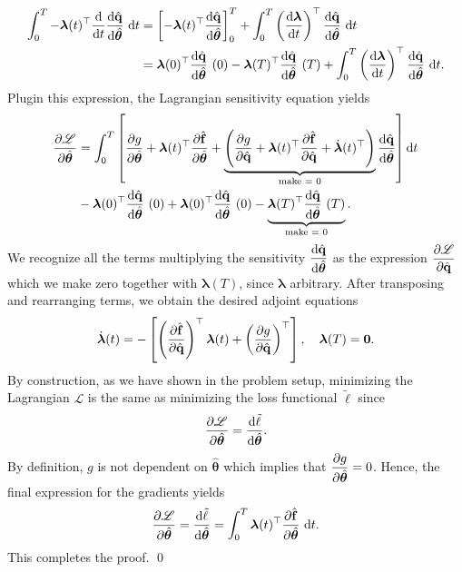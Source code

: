 \begin{align*}
    \int_0^T -\bm{\lambda}(t)^{\top}\dv{t}\dv{\hat{\mathbf{q}}}{\hat{\bm{\theta}}}~\dd t &= \left[ -\bm{\lambda}(t)^{\top}\dv{\hat{\mathbf{q}}}{\hat{\bm{\theta}}}\right]_0^T + \int_0^T \left( \dv{\bm{\lambda}}{t}\right)^{\top}\dv{\hat{\mathbf{q}}}{\hat{\bm{\theta}}}~\dd t\\
    &= \bm{\lambda}(0)^{\top}\dv{\hat{\mathbf{q}}}{\hat{\bm{\theta}}}~(0) - \bm{\lambda}(T)^{\top}\dv{\hat{\mathbf{q}}}{\hat{\bm{\theta}}}~(T) + \int_0^T \left( \dv{\bm{\lambda}}{t}\right)^{\top}\dv{\hat{\mathbf{q}}}{\hat{\bm{\theta}}}~\dd t.
\end{align*}
Plugin this expression, the Lagrangian sensitivity equation  yields\\
\begin{align*}
   \pdv{\mathscr{L}}{\hat{\bm{\theta}}} &= \int_0^T\left[ \pdv{g}{\hat{\bm{\theta}}} + \bm{\lambda}(t)^{\top} \pdv{\hat{\mathbf{f}}}{\hat{\bm{\theta}}} + \underbrace{\left( \pdv{g}{\hat{\mathbf{q}}} + \bm{\lambda}(t)^{\top}\pdv{\hat{\mathbf{f}}}{\hat{\mathbf{q}}}+ \dot{\bm{\lambda}}(t)^{\top}\right)}_{\text{make = 0}} \dv{\hat{\mathbf{q}}}{\hat{\bm{\theta}}} \right]\dd t \\
   & - \bm{\lambda}(0)^{\top}\dv{\hat{\mathbf{q}}}{\hat{\bm{\theta}}}~(0)+\bm{\lambda}(0)^{\top}\dv{\hat{\mathbf{q}}}{\hat{\bm{\theta}}}~(0) - \underbrace{\bm{\lambda}(T)^{\top}\dv{\hat{\mathbf{q}}}{\hat{\bm{\theta}}}~(T)}_{\text{make = 0}}.
\end{align*}
We recognize all the terms multiplying the sensitivity $\displaystyle\dv{\hat{\mathbf{q}}}{\hat{\bm{\theta}}}$ as the expression $\displaystyle\pdv{\mathscr{L}}{\hat{\mathbf{q}}}$ which we make zero together with $\bm{\lambda}(T)$, since $\bm{\lambda}$ arbitrary.
 After transposing and rearranging terms, we obtain the desired adjoint equations\\
\begin{equation*}
    \dot{\bm{\lambda}}(t) = -\left[ \left(\pdv{\hat{\mathbf{f}}}{\hat{\mathbf{q}}}\right)^{\top} \bm{\lambda}(t)  + \left(\pdv{g}{\hat{\mathbf{q}}}\right)^{\top}\right], \quad\bm{\lambda}(T) = \bm{0}.
\end{equation*}
By construction, as we have shown in the problem setup,  minimizing the Lagrangian $\mathscr{L}$ is the same as minimizing the loss functional $\tilde\ell$ since\\
$$\pdv{\mathscr{L}}{\hat{\bm{\theta}}} = \dv{\tilde\ell}{\hat{\bm{\theta}}}.$$
By definition, $g$ is not dependent on $\hat{\bm{\theta}}$ which implies that $\displaystyle\pdv{g}{\hat{\bm{\theta}}}=0$. Hence, the final expression for the gradients yields\\
\begin{equation*}
    \pdv{\mathscr{L}}{\hat{\bm{\theta}}} =\dv{\tilde\ell}{\hat{\bm{\theta}}} = \int_0^T \bm{\lambda}(t)^{\top} \pdv{\hat{\mathbf{f}}}{\hat{\bm{\theta}}}~\dd t.
\end{equation*}
This completes the proof.
\qed

